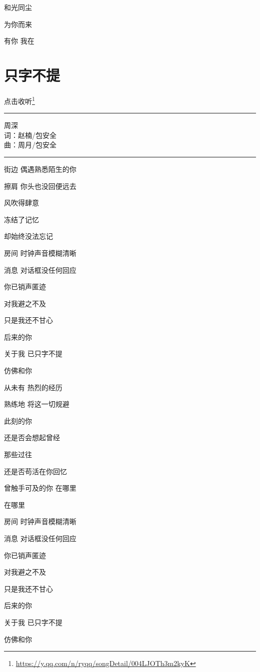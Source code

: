 \documentclass[]{ctexbook}
\renewcommand{\href}[2]{#2\footnote{\url{#1}}}
\begin{document}
和光同尘

为你而来

有你 我在

\section*{只字不提}\label{nothing-to-say}


\href{https://y.qq.com/n/ryqq/songDetail/004LJOTh3m2kyK}{点击收听}

\begin{center}\rule{0.5\linewidth}{0.5pt}\end{center}

周深\\
词：赵楠/包安全\\
曲：周月/包安全

\begin{center}\rule{0.5\linewidth}{0.5pt}\end{center}

街边 偶遇熟悉陌生的你

擦肩 你头也没回便远去

风吹得肆意

冻结了记忆

却始终没法忘记

房间 时钟声音模糊清晰

消息 对话框没任何回应

你已销声匿迹

对我避之不及

只是我还不甘心

后来的你

关于我 已只字不提

仿佛和你

从未有 热烈的经历

熟练地 将这一切规避

此刻的你

还是否会想起曾经

那些过往

还是否苟活在你回忆

曾触手可及的你 在哪里

在哪里

房间 时钟声音模糊清晰

消息 对话框没任何回应

你已销声匿迹

对我避之不及

只是我还不甘心

后来的你

关于我 已只字不提

仿佛和你
\end{document}
